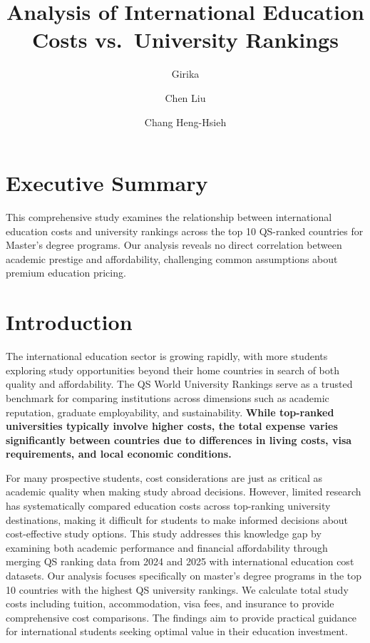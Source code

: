 \documentclass[
  letterpaper,
  DIV=11,
  numbers=noendperiod]{scrartcl}
\title{Analysis of International Education Costs vs.~University
Rankings}
\author{Girika \and Chen Liu \and Chang Heng-Hsieh}
\date{}
\renewcommand*\contentsname{Table of contents}
\newcommand\contentsname{Table of contents}
\begin{document}
\maketitle

\renewcommand*\contentsname{Table of contents}
{
\hypersetup{linkcolor=}
\setcounter{tocdepth}{3}
\tableofcontents
}

\section{Executive Summary}\label{executive-summary}

This comprehensive study examines the relationship between international
education costs and university rankings across the top 10 QS-ranked
countries for Master's degree programs. Our analysis reveals no direct
correlation between academic prestige and affordability, challenging
common assumptions about premium education pricing.

\section{Introduction}\label{introduction}

The international education sector is growing rapidly, with more
students exploring study opportunities beyond their home countries in
search of both quality and affordability. The QS World University
Rankings serve as a trusted benchmark for comparing institutions across
dimensions such as academic reputation, graduate employability, and
sustainability. \textbf{While top-ranked universities typically involve
higher costs, the total expense varies significantly between countries
due to differences in living costs, visa requirements, and local
economic conditions.}

For many prospective students, cost considerations are just as critical
as academic quality when making study abroad decisions. However, limited
research has systematically compared education costs across top-ranking
university destinations, making it difficult for students to make
informed decisions about cost-effective study options. This study
addresses this knowledge gap by examining both academic performance and
financial affordability through merging QS ranking data from 2024 and
2025 with international education cost datasets. Our analysis focuses
specifically on master's degree programs in the top 10 countries with
the highest QS university rankings. We calculate total study costs
including tuition, accommodation, visa fees, and insurance to provide
comprehensive cost comparisons. The findings aim to provide practical
guidance for international students seeking optimal value in their
education investment.
\end{document}
